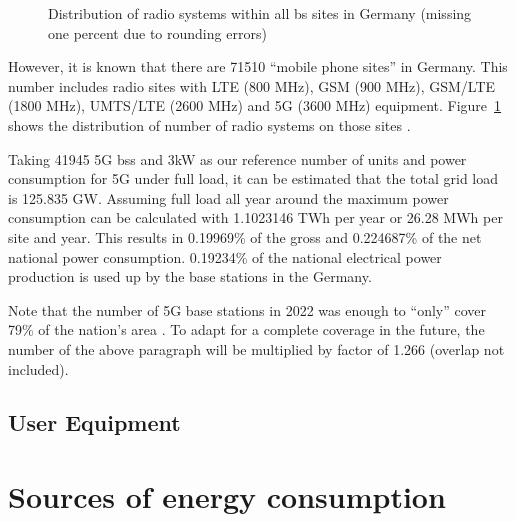 \documentclass[11pt,a4paper]{article}
\begin{document}
\begin{figure}[h]
  \centering
  \caption{Distribution of radio systems within all \acrlong*{bs} sites in Germany \citep{EMF} (missing one percent due to rounding errors)}
  \label{fig:EMFdistribution}
\end{figure}

However, it is known that there are 71510 \enquote{mobile phone sites} in Germany.
This number includes radio sites with LTE (800 MHz), GSM (900 MHz), GSM/LTE (1800 MHz), UMTS/LTE (2600 MHz) and 5G (3600 MHz) equipment.
Figure~\ref{fig:EMFdistribution} shows the distribution of number of radio systems on those sites \citep{EMF}.

Taking 41945 5G \acrlong{bs}s and 3kW as our reference number of units and power consumption for 5G under full load, it can be estimated that the total grid load is 125.835 GW.
Assuming full load all year around the maximum power consumption can be calculated with 1.1023146 TWh per year or 26.28 MWh per site and year.
This results in 0.19969\% of the gross and 0.224687\% of the net national power consumption.
0.19234\% of the national electrical power production is used up by the base stations in the Germany.

Note that the number of 5G base stations in 2022 was enough to \enquote{only} cover 79\% of the nation's area \citep{5Gausbau}.
To adapt for a complete coverage in the future, the number of the above paragraph will be multiplied by factor of 1.266 (overlap not included).

\subsection{User Equipment}\label{subsec:UEInfluence}


\section{Sources of energy consumption}\label{sec:energyconsumption}
\end{document}
